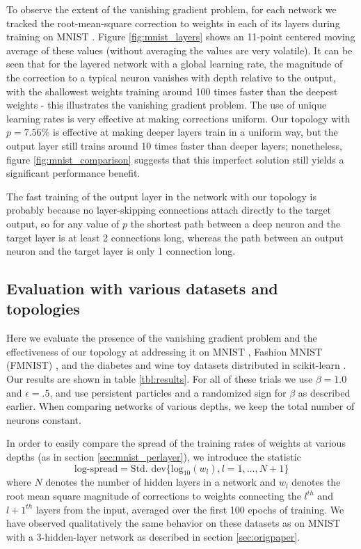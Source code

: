 \documentclass[utf8]{frontiersSCNS}
\begin{document}
To observe the extent of the vanishing gradient problem, for each network we tracked the root-mean-square correction to weights in each of its layers during training on MNIST \citep{mnist1998}. Figure \ref{fig:mnist_layers} shows an 11-point centered moving average of these values (without averaging the values are very volatile). It can be seen that for the layered network with a global learning rate, the magnitude of the correction to a typical neuron vanishes with depth relative to the output, with the shallowest weights training around 100 times faster than the deepest weights - this illustrates the vanishing gradient problem. The use of unique learning rates is very effective at making corrections uniform. Our topology with $p=7.56\%$ is effective at making deeper layers train in a uniform way, but the output layer still trains around 10 times faster than deeper layers; nonetheless, figure \ref{fig:mnist_comparison} suggests that this imperfect solution still yields a significant performance benefit.

The fast training of the output layer in the network with our topology is probably because no layer-skipping connections attach directly to the target output, so for any value of $p$ the shortest path between a deep neuron and the target layer is at least 2 connections long, whereas the path between an output neuron and the target layer is only 1 connection long.

\subsection{Evaluation with various datasets and topologies}
\label{sec:comparison}

Here we evaluate the presence of the vanishing gradient problem and the effectiveness of our topology at addressing it on MNIST \citep{mnist1998}, Fashion MNIST (FMNIST) \citep{fmnist2017}, and the diabetes and wine toy datasets distributed in scikit-learn \citep{sklearn2011}. Our results are shown in table \ref{tbl:results}. For all of these trials we use $\beta=1.0$ and $\epsilon=.5$, and use persistent particles and a randomized sign for $\beta$ as described earlier. When comparing networks of various depths, we keep the total number of neurons constant.

In order to easily compare the spread of the training rates of weights at various depths (as in section \ref{sec:mnist_perlayer}), we introduce the statistic
\begin{equation}
\label{eqn:spread}
	\text{log-spread} = \text{Std. dev}\{\text{log}_{10}(w_l), l=1,\hdots,N+1\}
\end{equation}
where $N$ denotes the number of hidden layers in a network and $w_l$ denotes the root mean square magnitude of corrections to weights connecting the $l^{th}$ and $l+1^{th}$ layers from the input, averaged over the first 100 epochs of training. We have observed qualitatively the same behavior on these datasets as on MNIST with a 3-hidden-layer network as described in section \ref{sec:origpaper}.
\end{document}
